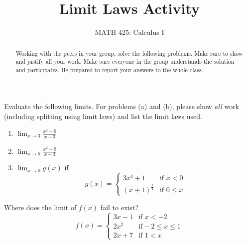 \documentclass{ximera}
\title{Limit Laws Activity}
\author{MATH 425: Calculus I}
\begin{document}
\begin{abstract}
    Working with the peers in your group, solve the following problems. Make sure to show and justify all your work. Make sure everyone in the group understands the solution and participates. Be prepared to report your answers to the whole class. 
\end{abstract}
\maketitle


\begin{exercise}
    Evaluate the following limits.  For problems (a) and (b), please show \textit{all} work (including splitting using limit laws) and list the limit laws used.
  \begin{enumerate}
 

    \item $\displaystyle \lim_{x\rightarrow 3} \frac{x^2-9}{x+3}$\\ 
    \item $\displaystyle \lim_{x\rightarrow 5} \frac{x^2-9}{x-3}$ \\
    \item $\displaystyle \lim_{x\rightarrow 0}g(x)$ if \[g(x)= 
    \begin{cases}
    3x^4+1 &\text{if }x<0\\
    (x+1)^{\frac14} &\text{if }0\leq x
    \end{cases}\]
  \end{enumerate}
\end{exercise}

\begin{exercise}
    Where does the limit of $f(x)$ fail to exist?  
      \[f(x)=
    \begin{cases}
    3x-1 &\text{if }x<-2\\
    2x^2 &\text{if} -2\leq x\leq 1\\
    2x+7 & \text{if } 1<x
    \end{cases}\]
\end{exercise}
\end{document}
